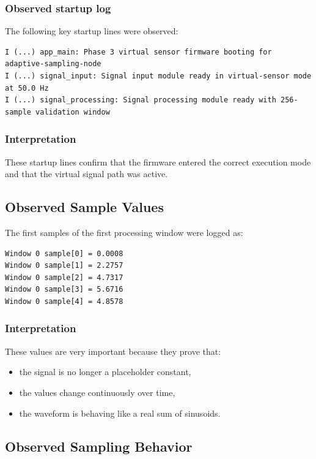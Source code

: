 \documentclass[12pt,a4paper]{article}
\begin{document}
\subsubsection*{Observed startup log}

The following key startup lines were observed:

\begin{lstlisting}
I (...) app_main: Phase 3 virtual sensor firmware booting for adaptive-sampling-node
I (...) signal_input: Signal input module ready in virtual-sensor mode at 50.0 Hz
I (...) signal_processing: Signal processing module ready with 256-sample validation window
\end{lstlisting}

\subsubsection*{Interpretation}

These startup lines confirm that the firmware entered the correct execution
mode and that the virtual signal path was active.

\subsection{Observed Sample Values}

The first samples of the first processing window were logged as:

\begin{lstlisting}
Window 0 sample[0] = 0.0008
Window 0 sample[1] = 2.2757
Window 0 sample[2] = 4.7317
Window 0 sample[3] = 5.6716
Window 0 sample[4] = 4.8578
\end{lstlisting}

\subsubsection*{Interpretation}

These values are very important because they prove that:

\begin{itemize}
    \item the signal is no longer a placeholder constant,
    \item the values change continuously over time,
    \item the waveform is behaving like a real sum of sinusoids.
\end{itemize}

\subsection{Observed Sampling Behavior}
\end{document}
